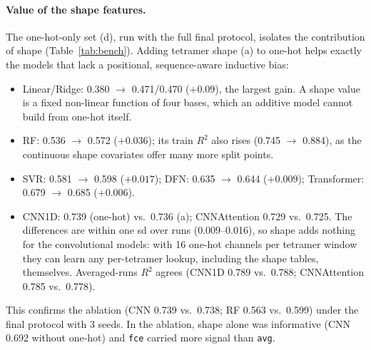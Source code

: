 \documentclass[11pt,a4paper]{article}
\begin{document}
\paragraph{Value of the shape features.} The one-hot-only set (d), run with the full final protocol, isolates the contribution of shape (Table~\ref{tab:bench}). Adding tetramer shape (a) to one-hot helps exactly the models that lack a positional, sequence-aware inductive bias:
\begin{itemize}
\item Linear/Ridge: 0.380 $\to$ 0.471/0.470 ($+0.09$), the largest gain. A shape value is a fixed non-linear function of four bases, which an additive model cannot build from one-hot itself.
\item RF: 0.536 $\to$ 0.572 ($+0.036$); its train $R^2$ also rises (0.745 $\to$ 0.884), as the continuous shape covariates offer many more split points.
\item SVR: 0.581 $\to$ 0.598 ($+0.017$); DFN: 0.635 $\to$ 0.644 ($+0.009$); Transformer: 0.679 $\to$ 0.685 ($+0.006$).
\item CNN1D: 0.739 (one-hot) vs.\ 0.736 (a); CNNAttention 0.729 vs.\ 0.725. The differences are within one sd over runs (0.009--0.016), so shape adds nothing for the convolutional models: with 16 one-hot channels per tetramer window they can learn any per-tetramer lookup, including the shape tables, themselves. Averaged-runs $R^2$ agrees (CNN1D 0.789 vs.\ 0.788; CNNAttention 0.785 vs.\ 0.778).
\end{itemize}
This confirms the ablation (CNN 0.739 vs.\ 0.738; RF 0.563 vs.\ 0.599) under the final protocol with 3 seeds. In the ablation, shape alone was informative (CNN 0.692 without one-hot) and \texttt{fce} carried more signal than \texttt{avg}.
\end{document}

